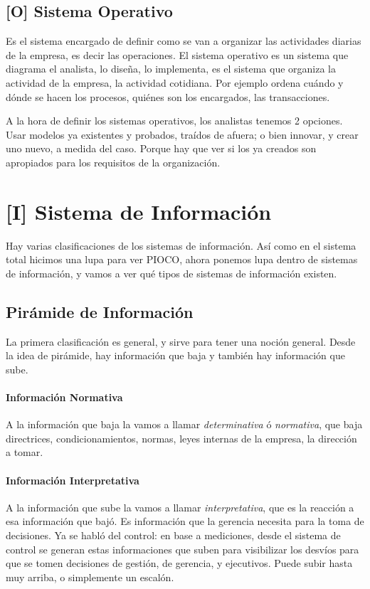\hypertarget{sistema-operativo}{%
\subsection{{[}O{]} Sistema Operativo}\label{sistema-operativo}}

Es el sistema encargado de definir como se van a organizar las
actividades diarias de la empresa, es decir las operaciones. El sistema
operativo es un sistema que diagrama el analista, lo diseña, lo
implementa, es el sistema que organiza la actividad de la empresa, la
actividad cotidiana. Por ejemplo ordena cuándo y dónde se hacen los
procesos, quiénes son los encargados, las transacciones.

A la hora de definir los sistemas operativos, los analistas tenemos 2
opciones. Usar modelos ya existentes y probados, traídos de afuera; o
bien innovar, y crear uno nuevo, a medida del caso. Porque hay que ver
si los ya creados son apropiados para los requisitos de la organización.

\hypertarget{sistema-de-informaciuxf3n}{%
\section{{[}I{]} Sistema de Información}\label{sistema-de-informaciuxf3n}}

Hay varias clasificaciones de los sistemas de información. Así como en
el sistema total hicimos una lupa para ver PIOCO, ahora ponemos lupa
dentro de sistemas de información, y vamos a ver qué tipos de sistemas
de información existen.

\hypertarget{piruxe1mide-de-informaciuxf3n}{%
\subsection{Pirámide de
Información}\label{piruxe1mide-de-informaciuxf3n}}

La primera clasificación es general, y sirve para tener una noción
general. Desde la idea de pirámide, hay información que baja y también
hay información que sube. 
\paragraph{Información Normativa}
A la información que baja la vamos a llamar
\emph{determinativa} ó \emph{normativa}, que baja directrices,
condicionamientos, normas, leyes internas de la empresa, la dirección a
tomar. 
\paragraph{Información Interpretativa}
A la información que sube la vamos a llamar
\emph{interpretativa}, que es la reacción a esa información que bajó. Es
información que la gerencia necesita para la toma de decisiones. Ya se
habló del control: en base a mediciones, desde el sistema de control se
generan estas informaciones que suben para visibilizar los desvíos para
que se tomen decisiones de gestión, de gerencia, y ejecutivos. Puede
subir hasta muy arriba, o simplemente un escalón. 

